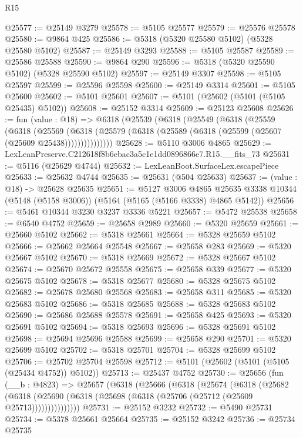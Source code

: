 \begin{lexlean}{R15}
\begin{coremodule}
{{{{{{{{{{{@25577 := @25149 @3279
@25578 := @5105 @25577
@25579 := @25576 @25578
@25580 := @9864 @425
@25586 := @5318 (@5320 @25580 @5102) (@5328 @25580 @5102)
@25587 := @25149 @3293
@25588 := @5105 @25587
@25589 := @25586 @25588
@25590 := @9864 @290
@25596 := @5318 (@5320 @25590 @5102) (@5328 @25590 @5102)
@25597 := @25149 @3307
@25598 := @5105 @25597
@25599 := @25596 @25598
@25600 := @25149 @3314
@25601 := @5105 @25600
@25602 := @5101 @25601
@25607 := @5101 (@25602 (@5101 (@5105 @25435) @5102))
@25608 := @25152 @3314
@25609 := @25123 @25608
@25626 := fun (value : @18) =>
  @6318
    (@25539
      (@6318
        (@25549
          (@6318
            (@25559
              (@6318
                (@25569
                  (@6318 (@25579 (@6318 (@25589 (@6318 (@25599 (@25607 (@25609 @25438)))))))))))))))
@25628 := @5110 @3006 @4865
@25629 := LexLeanPreserve.C212618f8b6ebac3a5c1e1dd0896866e7.R15.__fits_73
@25631 := @5116 (@25629 @4744)
@25632 := LexLeanBoot.SurfaceLex.escapePiece
@25633 := @25632 @4744
@25635 := @25631 (@504 @25633)
@25637 := (value : @18) -> @25628 @25635
@25651 := @5127
    @3006
    @4865
    @25635
    @3338
    @10344
    (@5148 (@5158 @3006))
    (@5164 (@5165 (@5166 @3338) @4865 @5142))
@25656 := @5461 @10344 @3230 @3237 @3336 @5221
@25657 := @5472 @25538
@25658 := @6540 @4752
@25659 := @25658 @2989
@25660 := @5320 @25659
@25661 := @25660 @5102
@25662 := @5318 @25661
@25664 := @5328 @25659 @5102
@25666 := @25662 @25664 @25548
@25667 := @25658 @283
@25669 := @5320 @25667 @5102
@25670 := @5318 @25669
@25672 := @5328 @25667 @5102
@25674 := @25670 @25672 @25558
@25675 := @25658 @339
@25677 := @5320 @25675 @5102
@25678 := @5318 @25677
@25680 := @5328 @25675 @5102
@25682 := @25678 @25680 @25568
@25683 := @25658 @311
@25685 := @5320 @25683 @5102
@25686 := @5318 @25685
@25688 := @5328 @25683 @5102
@25690 := @25686 @25688 @25578
@25691 := @25658 @425
@25693 := @5320 @25691 @5102
@25694 := @5318 @25693
@25696 := @5328 @25691 @5102
@25698 := @25694 @25696 @25588
@25699 := @25658 @290
@25701 := @5320 @25699 @5102
@25702 := @5318 @25701
@25704 := @5328 @25699 @5102
@25706 := @25702 @25704 @25598
@25712 := @5101 (@25602 (@5101 (@5105 (@25434 @4752)) @5102))
@25713 := @25437 @4752
@25730 := @25656
    (fun (__b : @4823) =>
    @25657
      (@6318
        (@25666
          (@6318
            (@25674
              (@6318
                (@25682
                  (@6318 (@25690 (@6318 (@25698 (@6318 (@25706 (@25712 (@25609 @25713)))))))))))))))
@25731 := @25152 @3232
@25732 := @5490 @25731
@25734 := @5378 @25661 @25664
@25735 := @25152 @3242
@25736 := @25734 @25735
}}}}}}}}}}}
\end{coremodule}
\end{lexlean}
